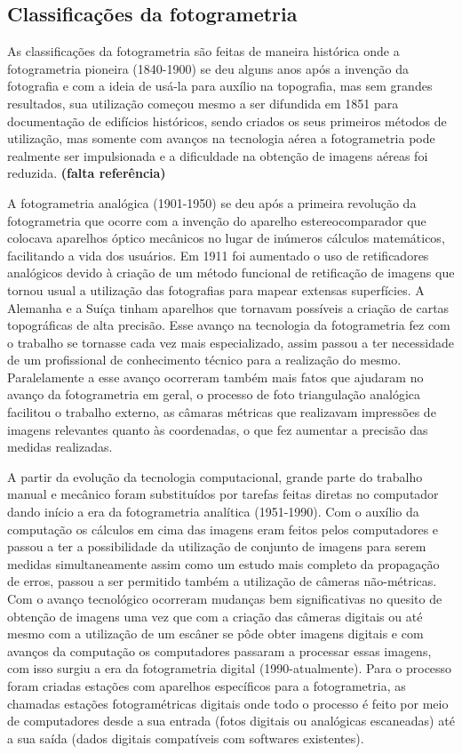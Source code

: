 \subsection{Classificações da fotogrametria}
As classificações da fotogrametria são feitas de maneira histórica onde a fotogrametria pioneira (1840-1900) se deu alguns anos após a invenção da fotografia e com a ideia de usá-la para auxílio na topografia, mas sem grandes resultados, sua utilização começou mesmo a ser difundida em 1851 para documentação de edifícios históricos, sendo criados os seus primeiros métodos de utilização, mas somente com avanços na tecnologia aérea a fotogrametria pode realmente ser impulsionada e a dificuldade na obtenção de imagens aéreas foi reduzida. \textbf{(falta referência)}

A fotogrametria analógica (1901-1950) se deu após a primeira revolução da fotogrametria que ocorre com a invenção do aparelho estereocomparador que colocava aparelhos óptico mecânicos no lugar de inúmeros cálculos matemáticos, facilitando a vida dos usuários. Em 1911 foi aumentado o uso de retificadores analógicos devido à criação de um método funcional de retificação de imagens que tornou usual a utilização das fotografias para mapear extensas superfícies. A Alemanha e a Suíça tinham aparelhos que tornavam possíveis a criação de cartas topográficas de alta precisão. Esse avanço na tecnologia da fotogrametria fez com o trabalho se tornasse cada vez mais especializado, assim passou a ter necessidade de um profissional de conhecimento técnico para a realização do mesmo. Paralelamente a esse avanço ocorreram também mais fatos que ajudaram no avanço da fotogrametria em geral, o processo de foto triangulação analógica facilitou o trabalho externo, as câmaras métricas que realizavam impressões de imagens relevantes quanto às coordenadas, o que fez aumentar a precisão das medidas realizadas.

A partir da evolução da tecnologia computacional, grande parte do trabalho manual e mecânico foram substituídos por tarefas feitas diretas no computador dando início a era da fotogrametria analítica (1951-1990). Com o auxílio da computação os cálculos em cima das imagens eram feitos pelos computadores e passou a ter a possibilidade da utilização de conjunto de imagens para serem medidas simultaneamente assim como um estudo mais completo da propagação de erros, passou a ser permitido também a utilização de câmeras não-métricas.
Com o avanço tecnológico ocorreram mudanças bem significativas no quesito de obtenção de imagens uma vez que com a criação das câmeras digitais ou até mesmo com a utilização de um escâner se pôde obter imagens digitais e com avanços da computação os computadores passaram a processar essas imagens, com isso surgiu a era da fotogrametria digital (1990-atualmente). Para o processo foram criadas estações com aparelhos específicos para a fotogrametria, as chamadas estações fotogramétricas digitais onde todo o processo é feito por meio de computadores desde a sua entrada (fotos digitais ou analógicas escaneadas) até a sua saída (dados digitais compatíveis com softwares existentes).

